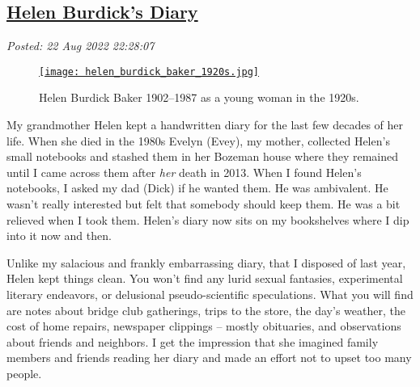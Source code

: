 %

\subsection*{\href{http://analyzethedatanotthedrivel.org/2022/08/22/helen-burdicks-diary/}{Helen Burdick's Diary}}

\noindent\emph{Posted: 22 Aug 2022 22:28:07}
\vspace{6pt}

\captionsetup[figure]{labelformat=empty}
\begin{SCfigure}
\centering
\href{https://conceptcontrol.smugmug.com/People/Grandparents-1/i-nBLh69S/A}{\texttt{[image: helen\_burdick\_baker\_1920s.jpg]}}
\caption[Helen Burdick Baker 1902--1987]{Helen Burdick Baker 1902--1987 as a young woman in the 1920s.}
\label{fig:7491x0}
\end{SCfigure}
 


My grandmother Helen kept a handwritten diary for the last few decades
of her life. When she died in the 1980s Evelyn (Evey), my mother,
collected Helen's small notebooks and stashed them in her Bozeman house
where they remained until I came across them after \emph{her} death in
2013. When I found Helen's notebooks, I asked my dad (Dick) if he wanted
them. He was ambivalent. He wasn't really interested but felt that
somebody should keep them. He was a bit relieved when I took them.
Helen's diary now sits on my bookshelves where I dip into it now and
then.


Unlike my salacious and frankly embarrassing diary, that I disposed of
last year, Helen kept things clean. You won't find any lurid sexual
fantasies, experimental literary endeavors, or delusional
pseudo-scientific speculations. What you will find are notes about
bridge club gatherings, trips to the store, the day's weather, the cost
of home repairs, newspaper clippings -- mostly obituaries, and
observations about friends and neighbors. I get the impression that she
imagined family members and friends reading her diary and made an effort
not to upset too many people.

